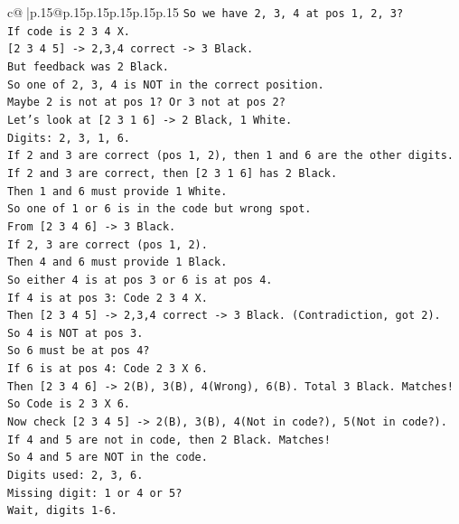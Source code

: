 \documentclass{article}
\begin{document}
{\begin{supertabular}{c@{$\;$}|p{.15\linewidth}@{}p{.15\linewidth}p{.15\linewidth}p{.15\linewidth}p{.15\linewidth}p{.15\linewidth}}
{{{\texttt{So we have 2, 3, 4 at pos 1, 2, 3?} \\
\texttt{If code is 2 3 4 X.} \\
\texttt{{[}2 3 4 5{]} {-}> 2,3,4 correct {-}> 3 Black.} \\
\texttt{But feedback was 2 Black.} \\
\texttt{So one of 2, 3, 4 is NOT in the correct position.} \\
\texttt{Maybe 2 is not at pos 1? Or 3 not at pos 2?} \\
\texttt{Let's look at {[}2 3 1 6{]} {-}> 2 Black, 1 White.} \\
\texttt{Digits: 2, 3, 1, 6.} \\
\texttt{If 2 and 3 are correct (pos 1, 2), then 1 and 6 are the other digits.} \\
\texttt{If 2 and 3 are correct, then {[}2 3 1 6{]} has 2 Black.} \\
\texttt{Then 1 and 6 must provide 1 White.} \\
\texttt{So one of 1 or 6 is in the code but wrong spot.} \\
\texttt{From {[}2 3 4 6{]} {-}> 3 Black.} \\
\texttt{If 2, 3 are correct (pos 1, 2).} \\
\texttt{Then 4 and 6 must provide 1 Black.} \\
\texttt{So either 4 is at pos 3 or 6 is at pos 4.} \\
\texttt{If 4 is at pos 3: Code 2 3 4 X.} \\
\texttt{Then {[}2 3 4 5{]} {-}> 2,3,4 correct {-}> 3 Black. (Contradiction, got 2).} \\
\texttt{So 4 is NOT at pos 3.} \\
\texttt{So 6 must be at pos 4?} \\
\texttt{If 6 is at pos 4: Code 2 3 X 6.} \\
\texttt{Then {[}2 3 4 6{]} {-}> 2(B), 3(B), 4(Wrong), 6(B). Total 3 Black. Matches!} \\
\texttt{So Code is 2 3 X 6.} \\
\texttt{Now check {[}2 3 4 5{]} {-}> 2(B), 3(B), 4(Not in code?), 5(Not in code?).} \\
\texttt{If 4 and 5 are not in code, then 2 Black. Matches!} \\
\texttt{So 4 and 5 are NOT in the code.} \\
\texttt{Digits used: 2, 3, 6.} \\
\texttt{Missing digit: 1 or 4 or 5?} \\
\texttt{Wait, digits 1{-}6.} \\
}}}
\end{supertabular}}
\end{document}
